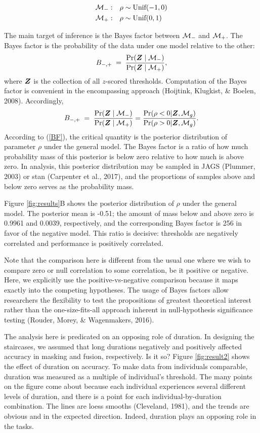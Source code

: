 \documentclass[
  ,man]{apa6}
\begin{document}
\[\begin{aligned}
{\cal M}_-:& \quad \rho \sim \mbox{Unif}(-1,0)\\
{\cal M}_+:& \quad \rho \sim \mbox{Unif}(0,1)
\end{aligned}
\]

The main target of inference is the Bayes factor between \({\cal M}_-\) and \({\cal M}_+\). The Bayes factor is the probability of the data under one model relative to the other:
\[
B_{-,+}\;=\;\frac{\Pr(\bm Z \mid {\cal M}_-)}{\Pr(\bm Z \mid {\cal M}_+)},
\]
where \(\bm Z\) is the collection of all \(z\)-scored thresholds. Computation of the Bayes factor is convenient in the encompassing approach (Hoijtink, Klugkist, \& Boelen, 2008). Accordingly,
\begin{equation} \label{BF}
B_{-,+}\;=\;\frac{\Pr(\bm Z \mid {\cal M}_-)}{\Pr(\bm Z \mid {\cal M}_+)} = \frac{\Pr(\rho<0|\bm Z, {\cal M}_g)}{\Pr(\rho>0|\bm Z,{\cal M}_g)}.
\end{equation}
According to (\ref{BF}), the critical quantity is the posterior distribution of parameter \(\rho\) under the general model. The Bayes factor is a ratio of how much probability mass of this posterior is below zero relative to how much is above zero. In analysis, this posterior distribution may be sampled in JAGS (Plummer, 2003) or stan (Carpenter et al., 2017), and the proportions of samples above and below zero serves as the probability mass.

Figure \ref{fig:results}B shows the posterior distribution of \(\rho\) under the general model. The posterior mean is -0.51;
the amount of mass below and above zero is 0.9961 and 0.0039, respectively, and the corresponding Bayes factor is 256 in favor of the negative model. This ratio is decisive: thresholds are negatively correlated and performance is positively correlated.

Note that the comparison here is different from the usual one where we wish to compare zero or null correlation to some correlation, be it positive or negative. Here, we explicitly use the positive-vs-negative comparison because it maps exactly into the competing hypotheses. The usage of Bayes factors allow researchers the flexibility to test the propositions of greatest theoretical interest rather than the one-size-fits-all approach inherent in null-hypothesis significance testing (Rouder, Morey, \& Wagenmakers, 2016).

The analysis here is predicated on an opposing role of duration. In designing the staircases, we assumed that long durations negatively and positively affected accuracy in masking and fusion, respectively. Is it so?
Figure \ref{fig:result2} shows the effect of duration on accuracy. To make data from individuals comparable, duration was measured as a multiple of individual's threshold. The many points on the figure come about because each individual experiences several different levels of duration, and there is a point for each individual-by-duration combination. The lines are loess smooths (Cleveland, 1981), and the trends are obvious and in the expected direction. Indeed, duration plays an opposing role in the tasks.
\end{document}
